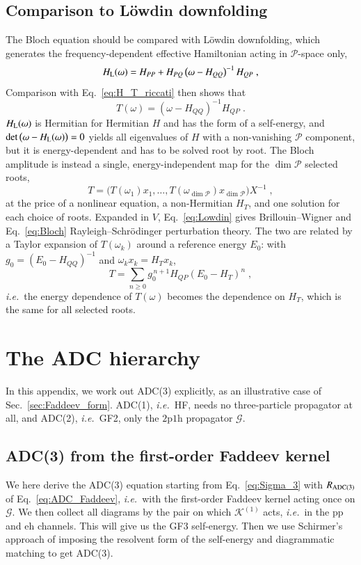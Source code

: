 \documentclass[aip,jcp,reprint,noshowkeys,superscriptaddress]{revtex4-1}
\newcommand{\ie}{\textit{i.e.}}
\newcommand{\cK}{\mathcal{K}}
\newcommand{\pph}{\text{2p1h}}
\newcommand{\eh}{\text{eh}}
\newcommand{\pp}{\text{pp}}
\begin{document}
\subsection{Comparison to L\"owdin downfolding}
The Bloch equation should be compared with L\"owdin downfolding, which 
generates the frequency-dependent effective Hamiltonian acting in 
$\mathcal{P}$-space only,
\begin{equation}
	H_{\rm L}(\omega) = H_{PP}+H_{PQ}\left(\omega-H_{QQ}\right)^{-1}H_{QP} \;,
	\label{eq:Lowdin}
\end{equation}
Comparison with Eq.~\eqref{eq:H_T_riccati} then shows that 
\begin{equation}
		T(\omega) = \left(\omega-H_{QQ}\right)^{-1}H_{QP} \;.
\end{equation}
$H_{\rm L}(\omega)$ is
Hermitian for Hermitian $H$ and has the form of a self-energy, and
$\det\big(\omega-H_{\rm L}(\omega)\big)=0$ yields all eigenvalues of $H$
with a non-vanishing $\mathcal{P}$ component, but it is
energy-dependent and has to be solved root by root. The Bloch amplitude
is instead a single, energy-independent map for the $\dim\mathcal{P}$
selected roots,
\begin{equation}
	T = \big(T(\omega_1)x_1,\ldots,T(\omega_{\dim\mathcal{P}})x_{\dim\mathcal{P}}\big)X^{-1} \;,
\end{equation}
at the price of a nonlinear equation, a non-Hermitian $H_T$, and
one solution for each choice of roots. Expanded in $V$, Eq.~\eqref{eq:Lowdin} gives Brillouin--Wigner and
Eq.~\eqref{eq:Bloch} Rayleigh--Schr\"odinger perturbation theory. The two
are related by a Taylor expansion of $T(\omega_k)$ around a reference energy
$E_0$: with $g_0=(E_0-H_{QQ})^{-1}$ and $\omega_kx_k=H_Tx_k$,
\begin{equation}
	T = \sum_{n\geq0}g_0^{\,n+1}H_{QP}\left(E_0-H_T\right)^n \;,
\end{equation}
\ie\ the energy dependence of $T(\omega)$ becomes the dependence on
$H_T$, which is the same for all selected roots.

\section{The ADC hierarchy}
\label{app:ADC}
In this appendix, we work out ADC(3) explicitly, as an illustrative
case of Sec.~\ref{sec:Faddeev_form}.
ADC(1), \ie\ HF, needs no three-particle propagator at all, and
ADC(2), \ie\ GF2, only the $\pph$ propagator $\mathcal G$.

\subsection{ADC(3) from the first-order Faddeev kernel}
We here derive the ADC(3) equation starting 
from Eq.~\eqref{eq:Sigma_3} with $R_{\rm ADC(3)}$ of
Eq.~\eqref{eq:ADC_Faddeev}, \ie\ with the first-order Faddeev kernel
acting once on $\mathcal G$. We then collect all diagrams by the pair on which
$\cK^{(1)}$ acts, \ie\ in the $\pp$ and $\eh$ channels. This will 
give us the GF3 self-energy. Then we use 
Schirmer's approach of imposing the resolvent form 
of the self-energy and diagrammatic matching to 
get ADC(3).
\end{document}
